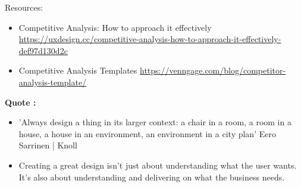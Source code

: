Resources:

\begin{itemize}
\item Competitive Analysis: How to approach it effectively \url{https://uxdesign.cc/competitive-analysis-how-to-approach-it-effectively-def97d130d2c}
\item Competitive Analysis Templates \url{https://venngage.com/blog/competitor-analysis-template/}
\end{itemize}

\textbf{Quote :}

\begin{itemize}
\item 'Always design a thing in its larger context: a chair in a room, a room in a house, a house in an environment, an environment in a city plan' Eero Sarrinen | Knoll
\item Creating a great design isn't just about understanding what the user wants. It's also about understanding and delivering on what the business needs.
\end{itemize}

